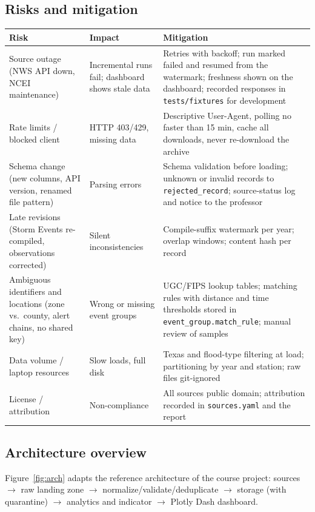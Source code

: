 \documentclass[11pt,letterpaper]{article}
\begin{document}
\subsection{Risks and mitigation}
\begin{longtable}{@{}p{3.5cm}p{5.5cm}p{5.8cm}@{}}\toprule
Risk & Impact & Mitigation\\\midrule\endhead
Source outage (NWS API down, NCEI maintenance) & Incremental runs fail; dashboard shows stale data & Retries with backoff; run marked failed and resumed from the watermark; freshness shown on the dashboard; recorded responses in \texttt{tests/fixtures} for development\\
Rate limits / blocked client & HTTP 403/429, missing data & Descriptive User-Agent, polling no faster than 15 min, cache all downloads, never re-download the archive\\
Schema change (new columns, API version, renamed file pattern) & Parsing errors & Schema validation before loading; unknown or invalid records to \texttt{rejected\_record}; source-status log and notice to the professor\\
Late revisions (Storm Events re-compiled, observations corrected) & Silent inconsistencies & Compile-suffix watermark per year; overlap windows; content hash per record\\
Ambiguous identifiers and locations (zone vs.\ county, alert chains, no shared key) & Wrong or missing event groups & UGC/FIPS lookup tables; matching rules with distance and time thresholds stored in \texttt{event\_group.match\_rule}; manual review of samples\\
Data volume / laptop resources & Slow loads, full disk & Texas and flood-type filtering at load; partitioning by year and station; raw files git-ignored\\
License / attribution & Non-compliance & All sources public domain; attribution recorded in \texttt{sources.yaml} and the report\\
\bottomrule\end{longtable}

\subsection{Architecture overview}
Figure~\ref{fig:arch} adapts the reference architecture of the course project: sources $\rightarrow$ raw landing zone $\rightarrow$ normalize/validate/deduplicate $\rightarrow$ storage (with quarantine) $\rightarrow$ analytics and indicator $\rightarrow$ Plotly Dash dashboard.
\end{document}
